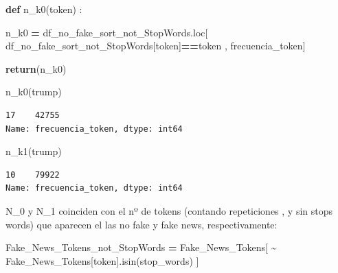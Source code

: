 \documentclass[
  11pt,
  a4paper,
]{article}
\newenvironment{Shaded}{\begin{snugshade}}{\end{snugshade}}
\newcommand{\ControlFlowTok}[1]{\textcolor[rgb]{0.13,0.29,0.53}{\textbf{#1}}}
\newcommand{\KeywordTok}[1]{\textcolor[rgb]{0.13,0.29,0.53}{\textbf{#1}}}
\newcommand{\NormalTok}[1]{#1}
\newcommand{\OperatorTok}[1]{\textcolor[rgb]{0.81,0.36,0.00}{\textbf{#1}}}
\newcommand{\StringTok}[1]{\textcolor[rgb]{0.31,0.60,0.02}{#1}}
\begin{document}
\begin{Shaded}
\begin{Highlighting}[]
\KeywordTok{def}\NormalTok{ n\_k0(token) : }

\NormalTok{    n\_k0 }\OperatorTok{=}\NormalTok{ df\_no\_fake\_sort\_not\_StopWords.loc[ df\_no\_fake\_sort\_not\_StopWords[}\StringTok{\textquotesingle{}token\textquotesingle{}}\NormalTok{]}\OperatorTok{==}\NormalTok{token , }\StringTok{\textquotesingle{}frecuencia\_token\textquotesingle{}}\NormalTok{]}

    \ControlFlowTok{return}\NormalTok{(n\_k0)}
\end{Highlighting}
\end{Shaded}

\begin{Shaded}
\begin{Highlighting}[]
\NormalTok{n\_k0(}\StringTok{\textquotesingle{}trump\textquotesingle{}}\NormalTok{) }
\end{Highlighting}
\end{Shaded}

\begin{verbatim}
17    42755
Name: frecuencia_token, dtype: int64
\end{verbatim}

\begin{Shaded}
\begin{Highlighting}[]
\NormalTok{n\_k1(}\StringTok{\textquotesingle{}trump\textquotesingle{}}\NormalTok{) }
\end{Highlighting}
\end{Shaded}

\begin{verbatim}
10    79922
Name: frecuencia_token, dtype: int64
\end{verbatim}

N\_0 y N\_1 coinciden con el nº de tokens (contando repeticiones , y sin
stops words) que aparecen el las no fake y fake news, respectivamente:

\begin{Shaded}
\begin{Highlighting}[]
\NormalTok{Fake\_News\_Tokens\_not\_StopWords }\OperatorTok{=}\NormalTok{ Fake\_News\_Tokens[ }\OperatorTok{\textasciitilde{}}\NormalTok{ Fake\_News\_Tokens[}\StringTok{\textquotesingle{}token\textquotesingle{}}\NormalTok{].isin(stop\_words) ]}
\end{Highlighting}
\end{Shaded}
\end{document}
